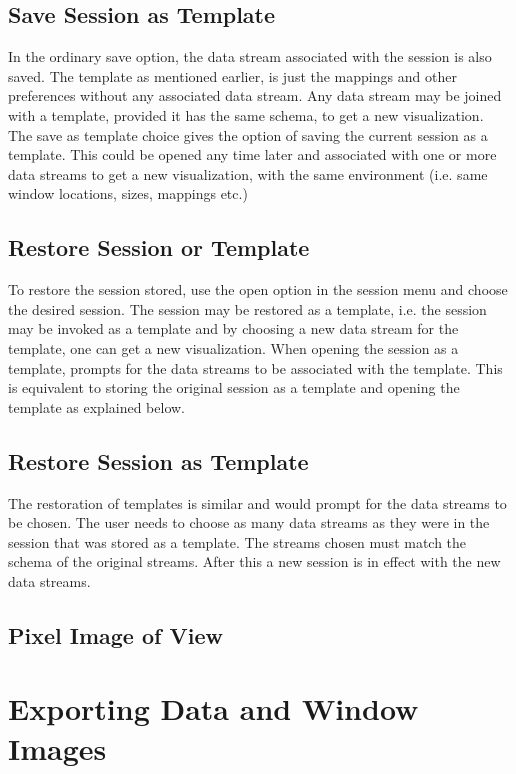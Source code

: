 \subsection{Save Session as Template}

In the ordinary save option, the data stream associated with the
session is also saved. The template as mentioned earlier, is just the
mappings and other preferences without any associated data stream. Any
data stream may be joined with a template, provided it has the same
schema, to get a new visualization. The save as template choice gives
the option of saving the current session as a template. This could be
opened any time later and associated with one or more data streams to
get a new visualization, with the same environment (i.e. same window
locations, sizes, mappings etc.)

\subsection{Restore Session or Template}

To restore the session stored, use the open option in the session menu
and choose the desired session. The session may be restored as a
template, i.e. the session may be invoked as a template and by
choosing a new data stream for the template, one can get a new
visualization. When opening the session as a template, \Devise prompts
for the data streams to be associated with the template. This is
equivalent to storing the original session as a template and opening
the template as explained below.

\subsection{Restore Session as Template}

The restoration of templates is similar and \Devise would prompt for
the data streams to be chosen. The user needs to choose as many data
streams as they were in the session that was stored as a template. The
streams chosen must match the schema of the original streams. After
this a new session is in effect with the new data streams.

\subsection{Pixel Image of View}


\section{Exporting Data and Window Images}

